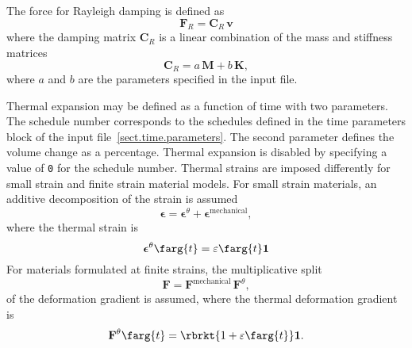 The force for Rayleigh damping is defined as
\begin{equation}
	\mathbf{F}_{R} = \mathbf{C}_{R}\,\mathbf{v}
\end{equation}
where the damping matrix $\mathbf{C}_{R}$ is a linear combination
of the mass and stiffness matrices
\begin{equation}
	\mathbf{C}_{R} = a\,\mathbf{M} + b\,\mathbf{K},
\end{equation}
where $a$ and $b$ are the parameters specified in the input file.

Thermal expansion may be defined as a function of time with 
two parameters. The schedule number 
corresponds to the schedules defined in the time parameters block of 
the input file~\ref{sect.time.parameters}. The second parameter defines the 
volume change as a percentage. Thermal expansion is disabled by 
specifying a value of \texttt{0} for the schedule number. 
Thermal strains are imposed 
differently for small strain and finite 
strain material models. For small strain materials, an additive decomposition 
of the strain is assumed
\begin{equation}
\boldsymbol{\epsilon} = 
    \boldsymbol{\epsilon}^{\theta} + 
	\boldsymbol{\epsilon}^{\mathrm{mechanical}},
\end{equation}
where the thermal strain is 
\begin{equation}
\boldsymbol{\epsilon}^{\theta}\farg{t} = \varepsilon\farg{t} \mathbf{1}
\end{equation}
For materials formulated at finite strains, the multiplicative split 
\begin{equation}
\mathbf{F} = \mathbf{F}^{\mathrm{mechanical}}\,
\mathbf{F}^{\theta},
\end{equation}
of the deformation 
gradient is assumed,
where the thermal deformation gradient is
\begin{equation}
\mathbf{F}^{\theta}\farg{t} = \rbrkt{1 + \varepsilon\farg{t}} \mathbf{1}.
\end{equation}

